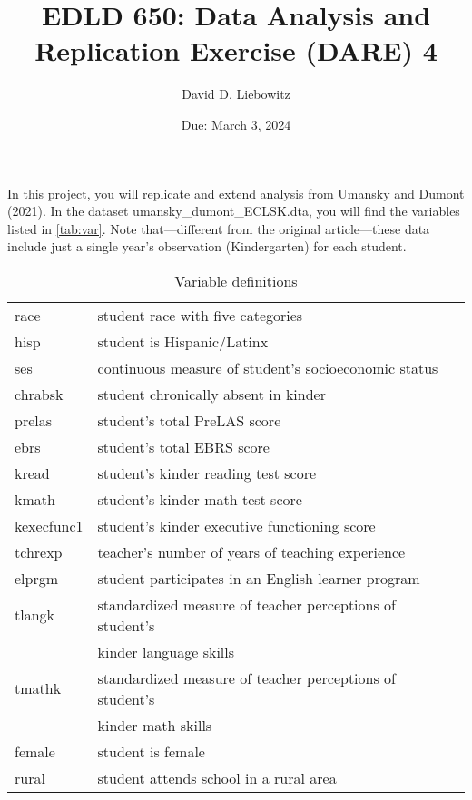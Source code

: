 \documentclass[a4paper, 11pt]{article}
\title{EDLD 650: Data Analysis and Replication Exercise (DARE) 4}
\author{David D. Liebowitz}
\date{Due: March 3, 2024}
\begin{document}
\maketitle

In this project, you will replicate and extend analysis from Umansky and Dumont (2021). In the dataset umansky\_dumont\_ECLSK.dta, you will find the variables listed in \autoref{tab:var}. Note that---different from the original article---these data include just a single year's observation (Kindergarten) for each student.

\begin{table}[!htbp] \centering 
  \caption{Variable definitions} 

  \label{tab:var} 
\begin{tabular}{ll} 
\hline
\hline
race  &    student race with five categories \\
hisp & student is Hispanic/Latinx \\
ses      &    continuous measure of student's socioeconomic status \\
chrabsk &     student chronically absent in kinder \\
prelas      &   student's total PreLAS score \\
ebrs          & student's total EBRS score \\
kread         &   student's kinder reading test score \\
kmath           &  student's kinder math test score \\
kexecfunc1     &   student's kinder executive functioning score \\
tchrexp         & teacher's number of years of teaching experience \\
elprgm      & student participates in an English learner program \\
tlangk        &     standardized measure of teacher perceptions of student's \\
&				 kinder language skills \\
tmathk        &  standardized measure of teacher perceptions of student's \\
&				kinder math skills \\
female       &student is female \\
rural          & student attends school in a rural area \\

\hline
\hline

\end{tabular}
\end{table}
\end{document}
